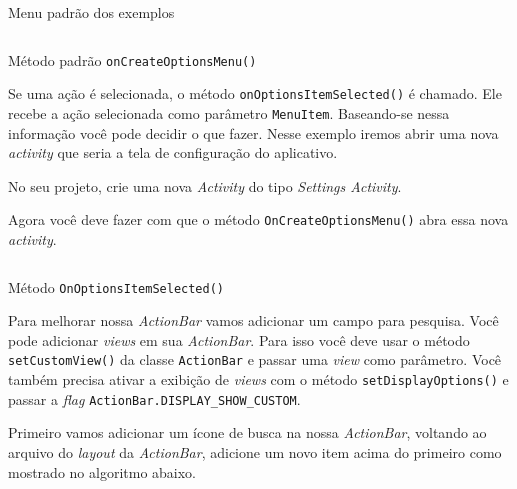 \documentclass[a4paper,12pt,brazil]{book}
\begin{document}
\begin{singlespace}
		\begin{listing}[H]
		\inputminted[linenos=true,fontsize=\small,frame=lines, framesep=2mm, tabsize=2,numbersep=5pt]{xml}{src/design/actionbar-menupadrao.xml}
		\caption{Menu padrão dos exemplos}
		\end{listing}

		\begin{listing}[H]
		\inputminted[linenos=true,fontsize=\small,frame=lines, framesep=2mm, tabsize=2,numbersep=5pt]{java}{src/design/oncreateoptionsmenu-padrao.java}
		\caption{Método padrão \texttt{onCreateOptionsMenu()}}
		\end{listing}
		
		Se uma ação é selecionada, o método \texttt{onOptionsItemSelected()} é chamado. Ele recebe a ação selecionada como parâmetro \texttt{MenuItem}. Baseando-se nessa informação você pode decidir o que fazer. Nesse exemplo iremos abrir uma nova \emph{activity} que seria a tela de configuração do aplicativo.
		
		No seu projeto, crie uma nova \emph{Activity} do tipo \emph{Settings Activity}. 
		
		
		Agora você deve fazer com que o método \texttt{OnCreateOptionsMenu()} abra essa nova \emph{activity}.
		
		\begin{listing}[H]
		\inputminted[linenos=true,fontsize=\small,frame=lines, framesep=2mm, tabsize=2,numbersep=5pt]{java}{src/design/onoptionsitemselected.java}
		\caption{Método \texttt{OnOptionsItemSelected()}}
		\end{listing}

		Para melhorar nossa \emph{ActionBar} vamos adicionar um campo para pesquisa. Você pode adicionar \emph{views} em sua \emph{ActionBar}. Para isso você deve usar o método \texttt{setCustomView()}  da classe \texttt{ActionBar} e passar uma \emph{view} como parâmetro. Você também precisa ativar a exibição de \emph{views} com o método \texttt{setDisplayOptions()} e passar a \emph{flag} \texttt{ActionBar.DISPLAY\_SHOW\_CUSTOM}.
		
		Primeiro vamos adicionar um ícone de busca na nossa \emph{ActionBar}, voltando ao arquivo do \emph{layout} da \emph{ActionBar}, adicione um novo item acima do primeiro como mostrado no algoritmo abaixo.
		

\end{singlespace}
\end{document}
